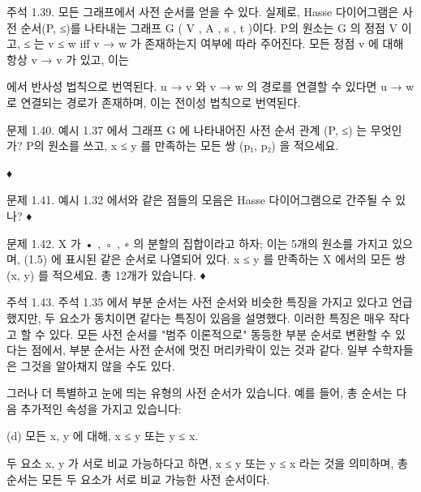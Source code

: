 \documentclass[11pt, a4paper, twoside, openany]{book}
\begin{document}
\par\medskip
주석 1.39. 모든 그래프에서 사전 순서를 얻을 수 있다. 실제로, Hasse 다이어그램은 사전 순서(P, ≤)를 나타내는 그래프 G  ( V , A , s , t )이다. P\hspace{0pt}의 원소는 G 의 정점 V 이고, ≤ 는 v ≤ w iﬀ  v → w 가 존재하는지 여부에 따라 주어진다. 모든 정점 v 에 대해 항상 v → v 가 있고, 이는 
\begin{definitionbox}[정의 1.30]
에서 반사성 법칙으로 번역된다. u → v 와 v → w 의 경로를 연결할 수 있다면 u → w 로 연결되는 경로가 존재하며, 이는 전이성 법칙으로 번역된다.
\end{definitionbox}

\par\medskip
문제 1.40. 예시 1.37 에서 그래프 G 에 나타내어진 사전 순서 관계 (P, ≤) 는 무엇인가? P\hspace{0pt}의 원소를 쓰고, x ≤ y 를 만족하는 모든 쌍 (p₁, p₂) 을 적으세요.

\par\medskip
♦

\par\medskip
문제 1.41.
예시 1.32 에서와 같은 점들의 모음은 Hasse 다이어그램으로 간주될 수 있나?
♦

\par\medskip
문제 1.42. X 가 {• , ◦ , ∗} 의 분할의 집합이라고 하자; 이는 5\hspace{0pt}개의 원소를 가지고 있으며, (1.5) 에 표시된 같은 순서로 나열되어 있다. x ≤ y 를 만족하는 X 에서의 모든 쌍 (x, y) 를 적으세요. 총 12\hspace{0pt}개가 있습니다.
♦

\par\medskip
주석 1.43. 주석 1.35 에서 부분 순서는 사전 순서와 비슷한 특징을 가지고 있다고 언급했지만, 두 요소가 동치이면 같다는 특징이 있음을 설명했다. 이러한 특징은 매우 작다고 할 수 있다. 모든 사전 순서를 "범주 이론적으로" 동등한 부분 순서로 변환할 수 있다는 점에서,  부분 순서는 사전 순서에 멋진 머리카락이 있는 것과 같다. 일부 수학자들은 그것을 알아채지 않을 수도 있다.

\par\medskip
그러나 더 특별하고 눈에 띄는 유형의 사전 순서가 있습니다. 예를 들어, 총 순서는 다음 추가적인 속성을 가지고 있습니다:

\par\medskip
(d) 모든 x, y 에 대해, x ≤ y 또는 y ≤ x.

\par\medskip
두 요소 x, y 가 서로 비교 가능하다고 하면, x ≤ y 또는 y ≤ x 라는 것을 의미하며, 총 순서는 모든 두 요소가 서로 비교 가능한 사전 순서이다.
\end{document}
